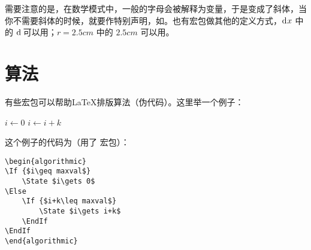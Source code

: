 需要注意的是，在数学模式中，一般的字母会被解释为变量，于是变成了斜体，当你不需要斜体的时候，就要作特别声明，如。也有宏包做其他的定义方式，$\diff x$ 中的 $\diff$ 可以用；$r=\unit{2.5cm}$ 中的 $\unit{2.5cm}$ 可以用。


\section{算法}
有些宏包可以帮助\LaTeX 排版算法（伪代码）。这里举一个例子：
\begin{algorithmic}
    \State $i\gets 0$
\Else
        \State $i\gets i+k$
    \EndIf
\EndIf
\end{algorithmic}

这个例子的代码为（用了 宏包）：
\begin{lstlisting}
\begin{algorithmic}
\If {$i\geq maxval$}
    \State $i\gets 0$
\Else
    \If {$i+k\leq maxval$}
        \State $i\gets i+k$
    \EndIf
\EndIf
\end{algorithmic}
\end{lstlisting}
